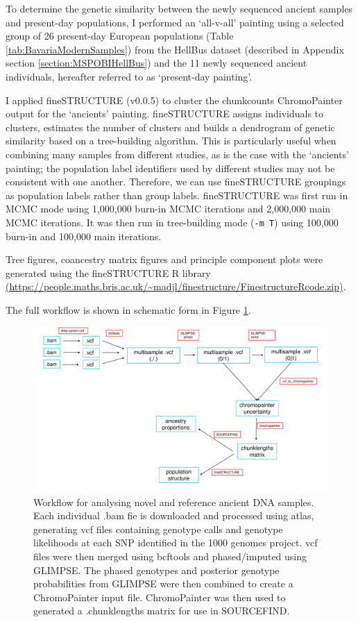 To determine the genetic similarity between the newly sequenced ancient samples and present-day populations, I performed an `all-v-all' painting using a selected group of 26 present-day European populations (Table \ref{tab:BavariaModernSamples}) from the HellBus dataset (described in Appendix section \ref{section:MSPOBIHellBus}) and the 11 newly sequenced ancient individuals, hereafter referred to as `present-day painting'.

I applied fineSTRUCTURE (v0.0.5)\cite{Lawson2012} to cluster the chunkcounts ChromoPainter output for the `ancients' painting. fineSTRUCTURE assigns individuals to clusters, estimates the  number of clusters and builds a dendrogram of genetic similarity based on a tree-building algorithm. This is particularly useful when combining many samples from different studies, as is the case with the `ancients' painting; the population label identifiers used by different studies may not be consistent with one another. Therefore, we can use fineSTRUCTURE groupings as population labels rather than group labels. fineSTRUCTURE was first run in MCMC mode using 1,000,000 burn-in MCMC iterations and 2,000,000 main MCMC iterations. It was then run in tree-building mode (\texttt{-m T}) using 100,000 burn-in and 100,000 main iterations. 

Tree figures, coancestry matrix figures and principle component plots were generated using the fineSTRUCTURE R library \url{(https://people.maths.bris.ac.uk/~madjl/finestructure/FinestructureRcode.zip)}.

The full workflow is shown in schematic form in Figure \ref{fig:workflow_bavaria}.

\begin{figure}[htp]
    \centering
    \includegraphics[width=1.0\textwidth]{../images/chapter4/workflow.pdf}
    \caption{Workflow for analysing novel and reference ancient DNA samples. Each individual .bam fie is downloaded and processed using atlas, generating vcf files containing genotype calls and genotype likelihoods at each SNP identified in the 1000 genomes project. vcf files were then merged using bcftools and phased/imputed using GLIMPSE. The phased genotypes and posterior genotype probabilities from GLIMPSE were then combined to create a ChromoPainter input file. ChromoPainter was then used to generated a .chunklengths matrix for use in SOURCEFIND.}
    \label{fig:workflow_bavaria}
\end{figure}


